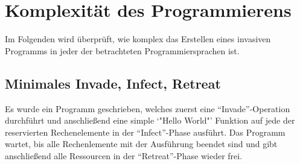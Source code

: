 
\section{Komplexität des Programmierens}

Im Folgenden wird überprüft, wie komplex das Erstellen eines invasiven Programms in jeder der betrachteten Programmiersprachen ist.

\subsection{Minimales Invade, Infect, Retreat}

Es wurde ein Programm geschrieben, welches zuerst eine "`Invade"'-Operation durchführt und anschließend eine simple `"Hello World"'
Funktion auf jede der reservierten Rechenelemente in der "`Infect"'-Phase ausführt. Das Programm wartet, bis alle Rechenlemente mit der
Ausführung beendet sind und gibt anschließend alle Ressourcen in der "`Retreat"'-Phase wieder frei.





